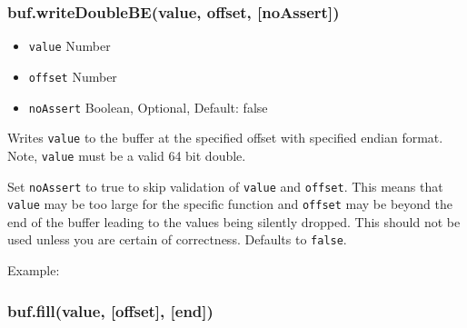 \subsubsection{buf.writeDoubleBE(value, offset,
{[}noAssert{]})}\label{buf.writedoublebevalue-offset-noassert}

\begin{itemize}
\itemsep1pt\parskip0pt
\item
  \texttt{value} Number
\item
  \texttt{offset} Number
\item
  \texttt{noAssert} Boolean, Optional, Default: false
\end{itemize}

Writes \texttt{value} to the buffer at the specified offset with
specified endian format. Note, \texttt{value} must be a valid 64 bit
double.

Set \texttt{noAssert} to true to skip validation of \texttt{value} and
\texttt{offset}. This means that \texttt{value} may be too large for the
specific function and \texttt{offset} may be beyond the end of the
buffer leading to the values being silently dropped. This should not be
used unless you are certain of correctness. Defaults to \texttt{false}.

Example:

\begin{Shaded}
\begin{Highlighting}[]
  \NormalTok{(}\NormalTok{);}
\NormalTok{(}\NormalTok{, }\NormalTok{);}


\NormalTok{(}\NormalTok{, }\NormalTok{);}


\end{Highlighting}
\end{Shaded}

\subsubsection{buf.fill(value, {[}offset{]},
{[}end{]})}\label{buf.fillvalue-offset-end}

